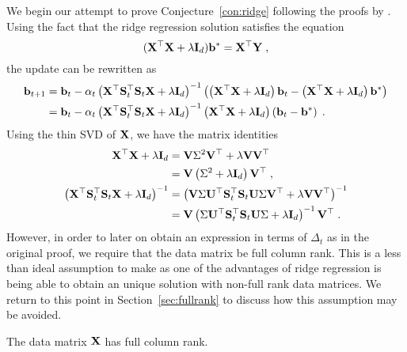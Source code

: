 We begin our attempt to prove Conjecture~\ref{con:ridge} following the proofs by \citet{Lacotte:2020}. Using the fact that the ridge regression solution satisfies the equation
\[
(\mathbf{X}^\top\mathbf{X} + \lambda\mathbf{I}_d)\mathbf{b}^* = \mathbf{X}^\top\mathbf{Y} \;,
\]
the update can be rewritten as
\begin{align*}
\mathbf{b}_{t+1} &= \mathbf{b}_t - \alpha_t\left(\mathbf{X}^\top\mathbf{S}_t^\top\mathbf{S}_t\mathbf{X} + \lambda\mathbf{I}_d\right)^{-1}\left(\left(\mathbf{X}^\top\mathbf{X}+\lambda\mathbf{I}_d\right)\mathbf{b}_t-\left(\mathbf{X}^\top\mathbf{X}+\lambda\mathbf{I}_d\right)\mathbf{b}^*\right) \\
&= \mathbf{b}_t - \alpha_t\left(\mathbf{X}^\top\mathbf{S}_t^\top\mathbf{S}_t\mathbf{X} + \lambda\mathbf{I}_d\right)^{-1}\left(\mathbf{X}^\top\mathbf{X}+\lambda\mathbf{I}_d\right)\left(\mathbf{b}_t-\mathbf{b}^*\right) \;.
\end{align*}
Using the thin SVD of $\mathbf{X}$, we have the matrix identities
\begin{align*}
\mathbf{X}^\top\mathbf{X}+\lambda\mathbf{I}_d &= \mathbf{V}\Sigma^2\mathbf{V}^\top + \lambda \mathbf{V}\mathbf{V}^\top \\
&= \mathbf{V}\left(\Sigma^2+ \lambda\mathbf{I}_d\right)\mathbf{V}^\top \;, \\
\left(\mathbf{X}^\top\mathbf{S}_t^\top\mathbf{S}_t\mathbf{X} + \lambda\mathbf{I}_d\right)^{-1} &= \left(\mathbf{V}\Sigma\mathbf{U}^\top\mathbf{S}_t^\top\mathbf{S}_t\mathbf{U}\Sigma\mathbf{V}^\top + \lambda\mathbf{V}\mathbf{V}^\top\right)^{-1} \\
&= \mathbf{V}\left(\Sigma\mathbf{U}^\top\mathbf{S}_t^\top\mathbf{S}_t\mathbf{U}\Sigma + \lambda\mathbf{I}_d\right)^{-1}\mathbf{V}^\top \;.
\end{align*}
However, in order to later on obtain an expression in terms of $\Delta_t$ as in the original proof, we require that the data matrix be full column rank. This is a less than ideal assumption to make as one of the advantages of ridge regression is being able to obtain an unique solution with non-full rank data matrices. We return to this point in Section~\ref{sec:fullrank} to discuss how this assumption may be avoided.

\begin{assumption} \label{asp:rank}
The data matrix $\mathbf{X}$ has full column rank.
\end{assumption}

